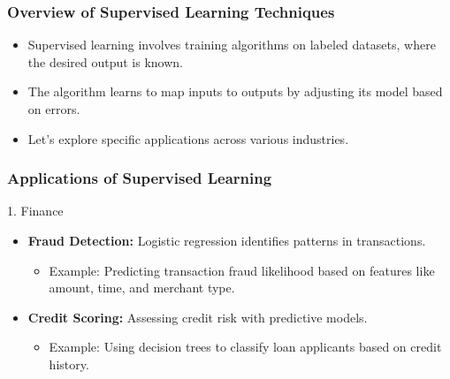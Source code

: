 \documentclass[aspectratio=169]{beamer}
\begin{document}
\begin{frame}[fragile]
    \frametitle{Overview of Supervised Learning Techniques}
    \begin{itemize}
        \item Supervised learning involves training algorithms on labeled datasets, where the desired output is known.
        \item The algorithm learns to map inputs to outputs by adjusting its model based on errors.
        \item Let’s explore specific applications across various industries.
    \end{itemize}
\end{frame}

\begin{frame}[fragile]
    \frametitle{Applications of Supervised Learning}
    \begin{block}{1. Finance}
        \begin{itemize}
            \item \textbf{Fraud Detection:} Logistic regression identifies patterns in transactions.
            \begin{itemize}
                \item Example: Predicting transaction fraud likelihood based on features like amount, time, and merchant type.
            \end{itemize}
            \item \textbf{Credit Scoring:} Assessing credit risk with predictive models.
            \begin{itemize}
                \item Example: Using decision trees to classify loan applicants based on credit history.
            \end{itemize}
        \end{itemize}
    \end{block}
\end{frame}
\end{document}
